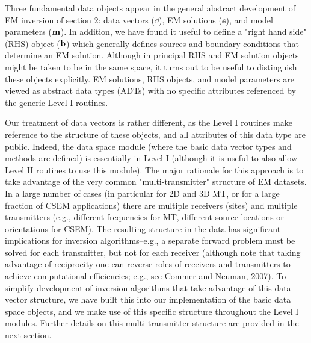 Three fundamental data objects appear in the general abstract development
of EM inversion of section 2: data vectors ($\dd$),
EM solutions ($\ee$), and model parameters (${\bf m}$).  In addition,
we have found it useful to define a "right hand side" (RHS) object
(${\bf b}$) which generally defines sources and boundary conditions
that determine an EM solution.  Although in principal RHS and EM solution
objects might be taken to be in the same space, it turns out to
be useful to distinguish these objects explicitly.
EM solutions, RHS objects, and model parameters are viewed as abstract
data types (ADTs) with no specific attributes referenced by
the generic Level I routines.

Our treatment of data vectors is rather different,
as the Level I routines make reference to the
structure of these objects, and all attributes
of this data type are public.  Indeed, the data space module
(where the basic data vector types and methods are defined)
is essentially in Level I (although it is useful to also allow Level II
routines to use this module).
The major rationale for this approach is to take advantage of
the very common "multi-transmitter" structure of EM datasets.
In a large number of cases (in particular for 2D and 3D MT, or
for a large fraction of CSEM applications) there are
multiple receivers (sites) and multiple transmitters (e.g., different
frequencies for MT, different source locations or orientations
for CSEM).  The resulting structure in the data has significant
implications for inversion algorithms--e.g., a separate forward
problem must be solved for each transmitter, but not for each
receiver (although note that taking advantage of reciprocity 
one can reverse roles of receivers and transmitters to achieve
computational efficiencies; e.g., see Commer and Neuman, 2007).
To simplify development of inversion algorithms that
take advantage of this data vector structure,
we have built this into our implementation of the basic
data space objects, and we make use of this specific structure
throughout the Level I modules.  Further details on this 
multi-transmitter structure are provided in the next section.

